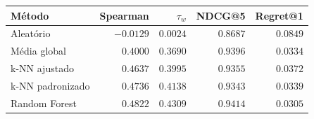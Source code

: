 \begin{tabular}{lrrrr}
\toprule
Método & Spearman & $\tau_w$ & NDCG@5 & Regret@1 \\
\midrule
Aleatório & $-0.0129$ & $0.0024$ & $0.8687$ & $0.0849$ \\
Média global & $0.4000$ & $0.3690$ & $0.9396$ & $0.0334$ \\
k-NN ajustado & $0.4637$ & $0.3995$ & $0.9355$ & $0.0372$ \\
k-NN padronizado & $0.4736$ & $0.4138$ & $0.9343$ & $0.0339$ \\
Random Forest & $0.4822$ & $0.4309$ & $0.9414$ & $0.0305$ \\
\bottomrule
\end{tabular}